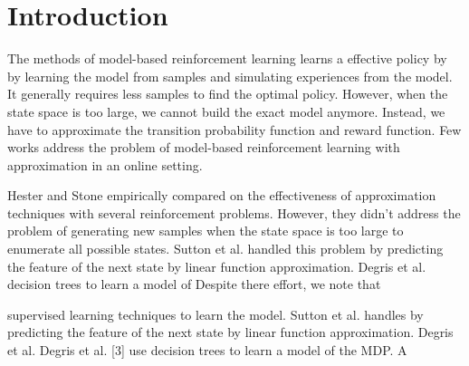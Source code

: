 \documentclass{article} %
\begin{document}

\section{Introduction}



The methods of model-based reinforcement learning learns a effective policy by 
by learning the model from samples and simulating experiences
from the model. It generally requires less samples to find the optimal policy. 
However, when the state space is too large, we cannot build the exact model anymore.
Instead, we have to approximate the transition probability function and 
reward function. Few works address the problem of model-based reinforcement learning
with approximation in an online setting.

Hester and Stone empirically compared on the effectiveness of 
approximation techniques with several reinforcement problems.
However, they didn't address the problem of generating 
new samples when the state space is too large to enumerate
all possible states.
Sutton et al. handled this problem by predicting the feature of the next state by linear function approximation.
Degris et al.  decision trees to learn a model of
Despite there effort, we note that 

supervised learning techniques to learn the model.
Sutton et al. handles by predicting the feature of the next state by linear function approximation.
Degris et al. 
Degris et al. [3] use decision trees to learn a model of
the MDP. A
\end{document}
